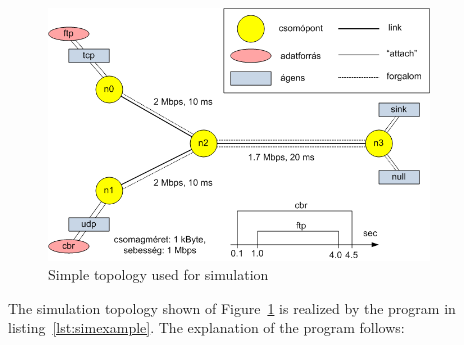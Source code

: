 \documentclass[a4paper]{article}
\begin{document}
\begin{figure}[H]
    \centering
    \includegraphics[width=0.9\textwidth]{figures/topology-new.png}
    \caption{Simple topology used for simulation}
    \label{fig:simplesim}
\end{figure}

The simulation topology shown of Figure~\ref{fig:simplesim} is realized by the program in listing~\ref{lst:simexample}. The explanation of the program follows:
\end{document}
